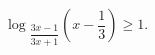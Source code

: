 \begin{ex}[type=inequality]
	\begin{condition}
		$ \log$\tiny$_{\dfrac{3x - 1}{3x + 1}}$\normalsize$\left(x - \dfrac{1}{3}\right)\geqslant1 .$
	\end{condition}
\end{ex}